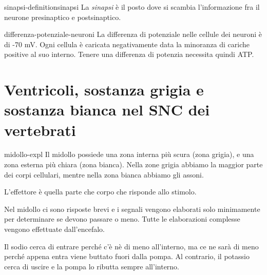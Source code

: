 \documentclass[preview]{standalone}
\begin{document}
\begin{snippetdefinition}{sinapsi-definition}{sinapsi}
    La \textit{sinapsi} è il posto dove si scambia l'informazione
    fra il neurone presinaptico e postsinaptico.
\end{snippetdefinition}

\begin{snippet}{differenza-potenziale-neuroni}
    La differenza di potenziale nelle cellule dei neuroni è di -70 mV. Ogni cellula è caricata
    negativamente data la minoranza di cariche positive al suo interno.
    Tenere una differenza di potenzia necessita quindi ATP.
\end{snippet}

\section{Ventricoli, sostanza grigia e sostanza bianca nel SNC dei vertebrati}

\begin{snippet}{midollo-expl}
    Il midollo possiede una zona interna più scura (zona grigia), e una zona esterna più chiara
    (zona bianca). Nella zone grigia abbiamo la maggior parte dei corpi cellulari,
    mentre nella zona bianca abbiamo gli assoni.

    L'effettore è quella parte che corpo che risponde allo stimolo.

    Nel midollo ci sono risposte brevi e i segnali vengono elaborati solo minimamente per determinare se devono passare o meno.
    Tutte le elaborazioni complesse vengono effettuate dall'encefalo.

    Il sodio cerca di entrare perché c'è nè di meno all'interno, ma ce ne sarà di meno perché appena entra
    viene buttato fuori dalla pompa.
    Al contrario, il potassio cerca di uscire e la pompa lo ributta sempre all'interno.

\end{snippet}
\end{document}
